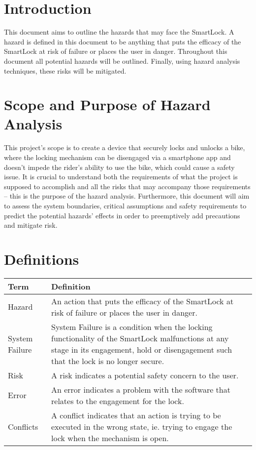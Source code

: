 \documentclass{article}
\begin{document}
\section{Introduction}

This document aims to outline the hazards that may face the SmartLock.  A hazard is defined in this document to be anything that puts the efficacy of the SmartLock at risk of failure or places the user in danger.  Throughout this document all potential hazards will be outlined. Finally, using hazard analysis techniques,  these risks will be mitigated. 

\section{Scope and Purpose of Hazard Analysis}

This project's scope is to create a device that securely locks and unlocks a bike, where the locking mechanism can be disengaged via a smartphone app and doesn’t impede the rider's ability to use the bike, which could cause a safety issue.  It is crucial to understand both the requirements of what the project is supposed to accomplish and all the risks that may accompany those requirements – this is the purpose of the hazard analysis.  Furthermore, this document will aim to assess the system boundaries, critical assumptions and safety requirements to predict the potential hazards' effects in order to preemptively add precautions and mitigate risk. 


\section{Definitions}

\begin{minipage}{\textwidth}
\renewcommand*{\arraystretch}{1.5}
\begin{tabular}{| p{} | p{} |}
 \hline
 Term & Definition \\ 
 \hline
 Hazard & An action that puts the efficacy of the SmartLock at risk of failure or places the user in danger.\\ 
  \hline
 System Failure & System Failure is a condition when the locking functionality of the SmartLock malfunctions at any stage in its engagement, hold or disengagement such that the lock is no longer secure.\\ 
  \hline
 Risk & A risk indicates a potential safety concern to the user.\\ 
  \hline
 Error & An error indicates a problem with the software that relates to the engagement for the lock.\\ 
  \hline
 Conflicts & A conflict indicates that an action is trying to be executed in the wrong state, ie. trying to engage the lock when the mechanism is open.\\ 
 \hline
\end{tabular}
\end{minipage}\\
\end{document}
